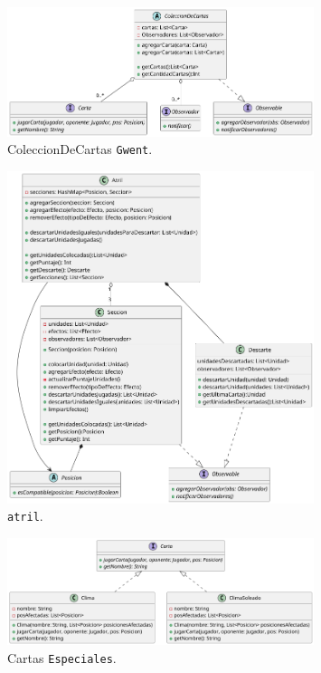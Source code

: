 \documentclass[titlepage,a4paper]{article}
\begin{document}
	\begin{figure}[H]
		\centering
		\includegraphics[width=0.8\textwidth]{diagramas/clases/ColeccionDeCartas}
		\caption{\label{fig:class03} ColeccionDeCartas \texttt{Gwent}.}
	\end{figure}

	\begin{figure}[H]
		\centering
		\includegraphics[width=0.8\textwidth]{diagramas/clases/Atril}
		\caption{\label{fig:class04}  \texttt{atril}.}
	\end{figure}


	\begin{figure}[H]
		\centering
		\includegraphics[width=0.8\textwidth]{diagramas/clases/Especiales1}
		\caption{\label{fig:class05} Cartas \texttt{Especiales}.}
	\end{figure}
\end{document}
